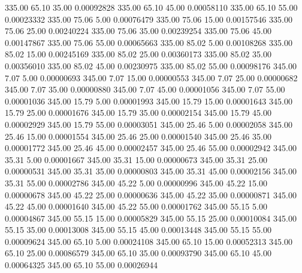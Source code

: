     335.00     65.10     35.00     0.00092828
    335.00     65.10     45.00     0.00058110
    335.00     65.10     55.00     0.00023332
    335.00     75.06      5.00     0.00076479
    335.00     75.06     15.00     0.00157546
    335.00     75.06     25.00     0.00240224
    335.00     75.06     35.00     0.00239254
    335.00     75.06     45.00     0.00147867
    335.00     75.06     55.00     0.00065663
    335.00     85.02      5.00     0.00108268
    335.00     85.02     15.00     0.00245169
    335.00     85.02     25.00     0.00360173
    335.00     85.02     35.00     0.00356010
    335.00     85.02     45.00     0.00230975
    335.00     85.02     55.00     0.00098176
    345.00      7.07      5.00     0.00000693
    345.00      7.07     15.00     0.00000553
    345.00      7.07     25.00     0.00000682
    345.00      7.07     35.00     0.00000880
    345.00      7.07     45.00     0.00001056
    345.00      7.07     55.00     0.00001036
    345.00     15.79      5.00     0.00001993
    345.00     15.79     15.00     0.00001643
    345.00     15.79     25.00     0.00001676
    345.00     15.79     35.00     0.00002154
    345.00     15.79     45.00     0.00002929
    345.00     15.79     55.00     0.00003051
    345.00     25.46      5.00     0.00002058
    345.00     25.46     15.00     0.00001554
    345.00     25.46     25.00     0.00001540
    345.00     25.46     35.00     0.00001772
    345.00     25.46     45.00     0.00002457
    345.00     25.46     55.00     0.00002942
    345.00     35.31      5.00     0.00001667
    345.00     35.31     15.00     0.00000673
    345.00     35.31     25.00     0.00000531
    345.00     35.31     35.00     0.00000803
    345.00     35.31     45.00     0.00002156
    345.00     35.31     55.00     0.00002786
    345.00     45.22      5.00     0.00000996
    345.00     45.22     15.00     0.00000678
    345.00     45.22     25.00     0.00000636
    345.00     45.22     35.00     0.00000871
    345.00     45.22     45.00     0.00001640
    345.00     45.22     55.00     0.00001762
    345.00     55.15      5.00     0.00004867
    345.00     55.15     15.00     0.00005829
    345.00     55.15     25.00     0.00010084
    345.00     55.15     35.00     0.00013008
    345.00     55.15     45.00     0.00013448
    345.00     55.15     55.00     0.00009624
    345.00     65.10      5.00     0.00024108
    345.00     65.10     15.00     0.00052313
    345.00     65.10     25.00     0.00086579
    345.00     65.10     35.00     0.00093790
    345.00     65.10     45.00     0.00064325
    345.00     65.10     55.00     0.00026944
